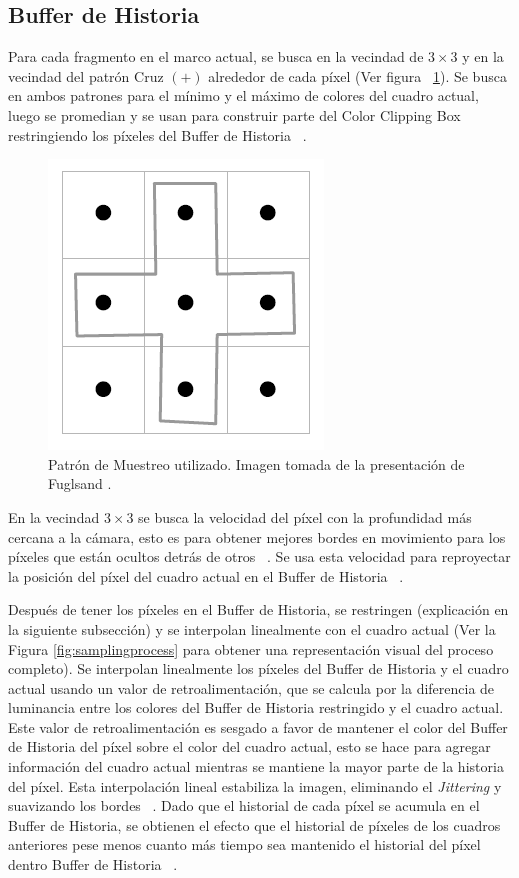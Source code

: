 \documentclass[pregrado]{tesis-usb} %
\begin{document}
\subsection{Buffer de Historia}
Para cada fragmento en el marco actual, se busca en la vecindad de $3\times 3$ y en la vecindad del patrón Cruz $(+)$ alrededor de cada píxel (Ver figura ~\ref{fig:samplingpattern}). Se busca en ambos patrones para el mínimo y el máximo de colores del cuadro actual, luego se promedian y se usan para construir parte del Color Clipping Box restringiendo los píxeles del Buffer de Historia ~\cite{Fuglsand2016}. 
\begin{figure}[!hbt]
	\centering
	\includegraphics[scale=0.8]{images/sampling_pattern.png}
	\caption{Patrón de Muestreo utilizado. Imagen tomada de la presentación de Fuglsand \protect\cite{Fuglsand2016}.}\label{fig:samplingpattern}
\end{figure}

En la vecindad $3\times 3$ se busca la velocidad del píxel con la profundidad más cercana a la cámara, esto es para obtener mejores bordes en movimiento para los píxeles que están ocultos detrás de otros ~\cite{Fuglsand2016}. Se usa esta velocidad para reproyectar la posición del píxel del cuadro actual en el Buffer de Historia ~\cite{Fuglsand2016, XU2016}. 

Después de tener los píxeles en el Buffer de Historia, se restringen (explicación en la siguiente subsección) y se interpolan linealmente con el cuadro actual (Ver la Figura \ref{fig:samplingprocess} para obtener una representación visual del proceso completo). Se interpolan linealmente los píxeles del Buffer de Historia y el cuadro actual usando un valor de retroalimentación, que se calcula por la diferencia de luminancia entre los colores del Buffer de Historia restringido y el cuadro actual. Este valor de retroalimentación es sesgado a favor de mantener el color del Buffer de Historia del píxel sobre el color del cuadro actual, esto se hace para agregar información del cuadro actual mientras se mantiene la mayor parte de la historia del píxel. Esta interpolación lineal estabiliza la imagen, eliminando el \textit{Jittering} y suavizando los bordes ~\cite{Fuglsand2016, XU2016}. Dado que el historial de cada píxel se acumula en el Buffer de Historia, se obtienen el efecto que el historial de píxeles de los cuadros anteriores pese menos cuanto más tiempo sea mantenido el historial del píxel dentro Buffer de Historia ~\cite{Fuglsand2016}. 
\end{document}
